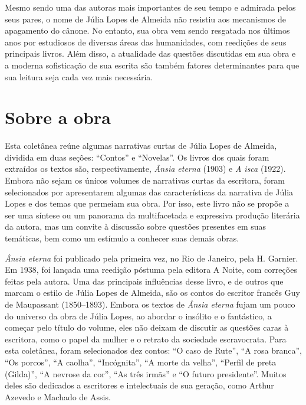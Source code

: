 Mesmo sendo uma das autoras mais importantes de seu tempo e admirada
pelos seus pares, o nome de Júlia Lopes de Almeida não resistiu aos
mecanismos de apagamento do cânone. No entanto, sua obra vem sendo
resgatada nos últimos anos por estudiosos de diversas áreas das
humanidades, com reedições de seus principais livros. Além disso, a
atualidade das questões discutidas em sua obra e a moderna sofisticação
de sua escrita são também fatores determinantes para que sua leitura
seja cada vez mais necessária.

\section{Sobre a obra}

Esta coletânea reúne algumas narrativas curtas de Júlia Lopes de
Almeida, dividida em duas seções: ``Contos'' e ``Novelas''. Os livros
dos quais foram extraídos os textos são, respectivamente, \emph{Ânsia
eterna} (1903) e \emph{A isca} (1922). Embora não sejam os únicos
volumes de narrativas curtas da escritora, foram selecionados por
apresentarem algumas das características da narrativa de Júlia Lopes e
dos temas que permeiam sua obra. Por isso, este livro não se propõe a
ser uma síntese ou um panorama da multifacetada e expressiva produção
literária da autora, mas um convite à discussão sobre questões presentes
em suas temáticas, bem como um estímulo a conhecer suas demais obras.

\emph{Ânsia eterna} foi publicado pela primeira vez, no Rio de Janeiro,
pela H. Garnier. Em 1938, foi lançada uma reedição póstuma pela editora
A Noite, com correções feitas pela autora. Uma das principais
influências desse livro, e de outros que marcam o estilo de Júlia Lopes
de Almeida, são os contos do escritor francês Guy de Maupassant
(1850--1893). Embora os textos de \emph{Ânsia eterna} fujam um pouco do
universo da obra de Júlia Lopes, ao abordar o insólito e o fantástico, a
começar pelo título do volume, eles não deixam de discutir as questões
caras à escritora, como o papel da mulher e o retrato da sociedade
escravocrata. Para esta coletânea, foram selecionados dez contos: ``O
caso de Rute'', ``A rosa branca'', ``Os porcos'', ``A caolha'',
``Incógnita'', ``A morte da velha'', ``Perfil de preta (Gilda)'', ``A
nevrose da cor'', ``As três irmãs'' e ``O futuro presidente''. Muitos
deles são dedicados a escritores e intelectuais de sua geração, como
Arthur Azevedo e Machado de Assis.

